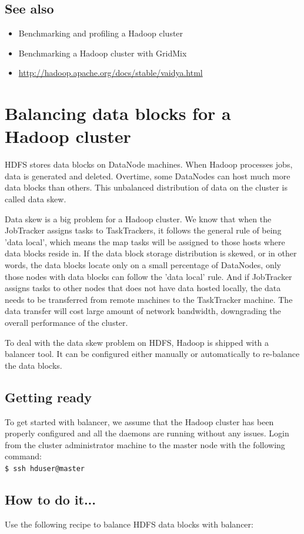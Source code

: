 \subsection*{See also}
\begin{itemize}
  \item Benchmarking and profiling a Hadoop cluster
  \item Benchmarking a Hadoop cluster with GridMix
  \item \url{http://hadoop.apache.org/docs/stable/vaidya.html}
\end{itemize}
\section{Balancing data blocks for a Hadoop cluster}
HDFS stores data blocks on DataNode machines. When Hadoop processes jobs, data is generated and deleted. Overtime, some DataNodes can host much more data blocks than others. This unbalanced distribution of data on the cluster is called data skew.

Data skew is a big problem for a Hadoop cluster. We know that when the JobTracker assigns tasks to TaskTrackers, it follows the general rule of being 'data local', which means the map tasks will be assigned to those hosts where data blocks reside in. If the data block storage distribution is skewed, or in other words, the data blocks locate only on a small percentage of DataNodes, only those nodes with data blocks can follow the 'data local' rule. And if JobTracker assigns tasks to other nodes that does not have data hosted locally, the data needs to be transferred from remote machines to the TaskTracker machine. The data transfer will cost large amount of network bandwidth, downgrading the overall performance of the cluster.

To deal with the data skew problem on HDFS, Hadoop is shipped with a balancer tool. It can be configured either manually or automatically to re-balance the data blocks.
\subsection*{Getting ready}
To get started with balancer, we assume that the Hadoop cluster has been properly configured and all the daemons are running without any issues.
Login from the cluster administrator machine to the master node with the following command: \\
\verb|$ ssh hduser@master|
\subsection*{How to do it...}
Use the following recipe to balance HDFS data blocks with balancer:

